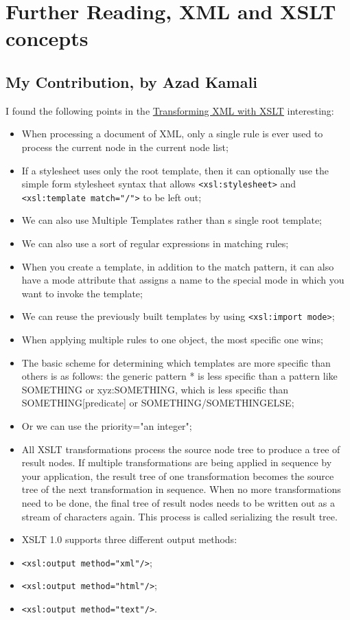
%
\section{Further Reading, XML and XSLT concepts}
\label{sect:azad}
\subsection{My Contribution, by Azad Kamali}
	I found the following points in the \href{http://oreilly.com/catalog/orxmlapp/chapter/ch07.pdf}{Transforming XML with XSLT} interesting:
        \begin{itemize}
		\item When processing a document of XML, only a single rule is ever used to process the current node in the current node list;
		\item If a stylesheet uses only the root template, then it can optionally use the simple form stylesheet syntax that allows \verb~<xsl:stylesheet>~ and \verb~<xsl:template match="/">~ to be left out;
		\item We can also use Multiple Templates rather than s single root template;
		\item We can also use a sort of regular expressions in matching rules;
		\item When you create a template, in addition to the match pattern, it can also have a mode attribute that assigns a name to the special mode in which you want to invoke the template;
    \item We can reuse the previously built templates by using \verb~<xsl:import mode>~;
		\item When applying multiple rules to one object, the most specific one wins;
		\item The basic scheme for determining which templates are more specific than others is as follows: the generic pattern * is less specific than a pattern like SOMETHING or xyz:SOMETHING, which is less specific than SOMETHING[predicate] or SOMETHING/SOMETHINGELSE;
		\item Or we can use the priority="an integer";
		\item All XSLT transformations process the source node tree to produce a tree of result nodes. If multiple transformations are being applied in sequence by your application, the result tree of one transformation becomes the source tree of the next transformation in sequence. When no more transformations need to be done, the final tree of result nodes needs to be written out as a stream of characters again. This process is called serializing the result tree.
		\item XSLT 1.0 supports three different output methods:
		\item  \verb~<xsl:output method="xml"/>~;
		\item \verb~<xsl:output method="html"/>~;
		\item \verb~<xsl:output method="text"/>~.
        \end{itemize}
